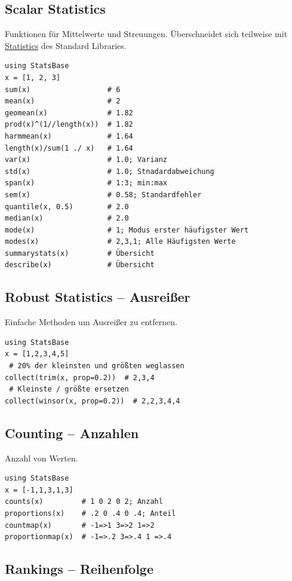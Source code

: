 \documentclass[10pt,twocolumn]{scrartcl}
\begin{document}
\subsection{Scalar Statistics}
\label{ssec:StatsBase_ScalarStatistics}

Funktionen für Mittelwerte und Streuungen. Überschneidet sich teilweise mit
\hyperref[ssec:standardLibrary_Statistics]{Statistics} des Standard Libraries.

\begin{lstlisting}
using StatsBase
x = [1, 2, 3]
sum(x)                  # 6
mean(x)                 # 2
geomean(x)              # 1.82
prod(x)^(1//length(x))  # 1.82
harmmean(x)             # 1.64
length(x)/sum(1 ./ x)   # 1.64
var(x)                  # 1.0; Varianz
std(x)                  # 1.0; Stnadardabweichung
span(x)                 # 1:3; min:max
sem(x)                  # 0.58; Standardfehler
quantile(x, 0.5)        # 2.0
median(x)               # 2.0
mode(x)                 # 1; Modus erster häufigster Wert
modes(x)                # 2,3,1; Alle Häufigsten Werte
summarystats(x)         # Übersicht
describe(x)             # Übersicht
\end{lstlisting}

\subsection{Robust Statistics -- Ausreißer}

Einfache Methoden um Ausreißer zu entfernen.

\begin{lstlisting}
using StatsBase
x = [1,2,3,4,5]
 # 20% der kleinsten und größten weglassen
collect(trim(x, prop=0.2))  # 2,3,4
 # Kleinste / größte ersetzen
collect(winsor(x, prop=0.2))  # 2,2,3,4,4
\end{lstlisting}

\subsection{Counting -- Anzahlen}

Anzahl von Werten.

\begin{lstlisting}
using StatsBase
x = [-1,1,3,1,3]
counts(x)         # 1 0 2 0 2; Anzahl
proportions(x)    # .2 0 .4 0 .4; Anteil
countmap(x)       # -1=>1 3=>2 1=>2
proportionmap(x)  # -1=>.2 3=>.4 1 =>.4
\end{lstlisting}

\subsection{Rankings -- Reihenfolge}
\end{document}

